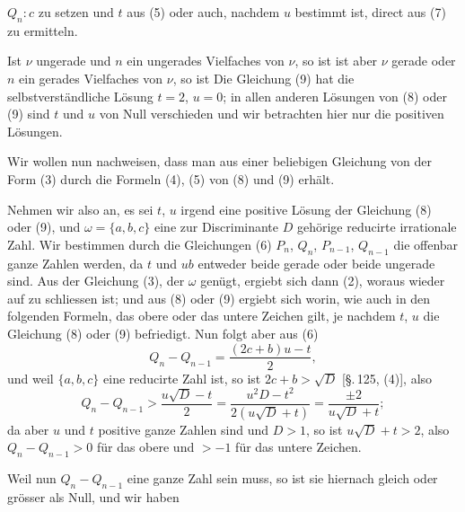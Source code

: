 $Q_n : c$ zu setzen und $t$ aus (5) oder auch, nachdem $u$ bestimmt
ist, direct aus (7) zu ermitteln.

Ist $\nu$ ungerade und $n$ ein ungerades Vielfaches von $\nu$, so ist
ist aber $\nu$ gerade oder $n$ ein gerades Vielfaches von $\nu$, so ist
Die Gleichung (9) hat die selbstverständliche Lösung $t = 2$,
$u = 0$; in allen anderen Lösungen von (8) oder (9) sind $t$ und
$u$ von Null verschieden und wir betrachten hier nur die positiven
Lösungen.

Wir wollen nun nachweisen, dass man aus einer beliebigen
Gleichung von der Form (3) durch die Formeln (4), (5)  von (8) und (9) erhält.

Nehmen wir also an, es sei $t$, $u$ irgend eine positive Lösung
der Gleichung (8) oder (9), und $\omega = \{a, b, c\}$ eine zur Discriminante $D$ gehörige reducirte irrationale Zahl. Wir bestimmen
durch die Gleichungen (6) $P_n$, $Q_n$, $P_{n-1}$, $Q_{n-1}$ die offenbar ganze
Zahlen werden, da $t$ und $u b$ entweder beide gerade oder beide
ungerade sind. Aus der Gleichung (3), der $\omega$ genügt, ergiebt sich
dann (2), woraus wieder auf
zu schliessen ist; und aus (8) oder (9) ergiebt sich
worin, wie auch in den folgenden Formeln, das obere oder das
untere Zeichen gilt, je nachdem $t$, $u$ die Gleichung (8) oder (9)
befriedigt. Nun folgt aber aus (6)
\[
Q_n - Q_{n-1} = \frac{(2 c + b) u - t}{2},
\]
und weil $\{a, b, c\}$ eine reducirte Zahl ist, so ist $2 c + b > \sqrt{D}$
[\S.\,125, (4)], also
\[
Q_n - Q_{n-1} > \frac{u \sqrt{D} - t}{2} = \frac{u^2 D - t^2}{2(u \sqrt{D} + t)} = \frac{\pm 2}{u \sqrt{D} + t};
\]
da aber $u$ und $t$ positive ganze Zahlen sind und $D > 1$, so ist
$u \sqrt{D} + t > 2$, also $Q_n - Q_{n-1} > 0$ für das obere und $> -1$
für das untere Zeichen.

Weil nun $Q_n - Q_{n-1}$ eine ganze Zahl sein muss, so ist
sie hiernach gleich oder grösser als Null, und wir haben
